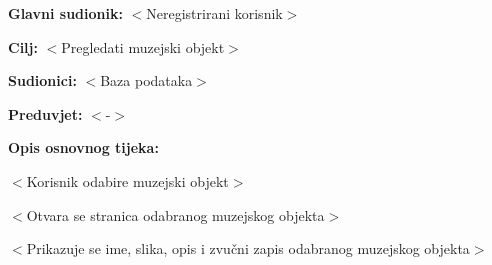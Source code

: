 	\noindent {}
	\begin{packed_item}
		
		\item \textbf{Glavni sudionik: }$<$Neregistrirani korisnik$>$
		\item  \textbf{Cilj:} $<$Pregledati muzejski objekt$>$
		\item  \textbf{Sudionici:} $<$Baza podataka$>$
		\item  \textbf{Preduvjet:} $<$-$>$
		\item  \textbf{Opis osnovnog tijeka:}
		
		\item[] \begin{packed_enum}
			
			\item $<$Korisnik odabire muzejski objekt$>$
			\item $<$Otvara se stranica odabranog muzejskog objekta$>$
			\item $<$Prikazuje se ime, slika, opis i zvučni zapis odabranog muzejskog objekta$>$
		\end{packed_enum}
		
	\end{packed_item}
	
